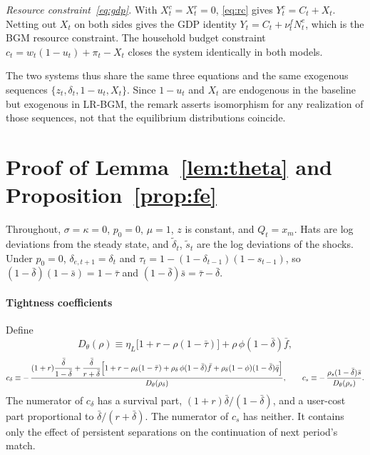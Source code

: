 \documentclass[authoryear, review, 12pt]{elsarticle}
\begin{document}
\emph{Resource constraint~\eqref{eq:gdp}.} With
$X_t^c=X_t^r=0$, \eqref{eq:rc} gives $Y_t^c = C_t + X_t$.
Netting out $X_t$ on both sides gives the GDP identity
$Y_t = C_t + \nu_t^f N_t^e$, which is the BGM resource constraint.
The household budget constraint
$c_t = w_t(1-u_t) + \pi_t - X_t$
closes the system identically in both models.

The two systems thus share the same three equations and
the same exogenous sequences $\{z_t,\delta_t,1-u_t,X_t\}$.
Since $1-u_t$ and $X_t$ are endogenous in the baseline but
exogenous in LR-BGM, the remark asserts isomorphism
for any realization of those sequences, not that the
equilibrium distributions coincide.

\section{Proof of Lemma~\ref{lem:theta} and Proposition~\ref{prop:fe}}
\label{app:proof_fe}

Throughout, $\sigma=\kappa=0$, $p_0=0$, $\mu=1$, $z$ is constant, and $Q_t=x_m$. Hats are log
deviations from the steady state, and $\tilde\delta_t$, $\tilde{s}_t$ are the log deviations
of the shocks. Under $p_0=0$, $\delta_{e,t+1}=\delta_t$ and
$\tau_t=1-(1-\delta_{t-1})(1-s_{t-1})$, so $(1-\bar\delta)(1-\bar{s})=1-\bar\tau$ and
$(1-\bar\delta)\bar{s}=\bar\tau-\bar\delta$.

\paragraph{Tightness coefficients}
Define
\[
	D_\theta(\rho)\equiv\eta_L\bigl[1+r-\rho(1-\bar\tau)\bigr]+\rho\,\phi(1-\bar\delta)\bar{f},
\]
\begin{equation}\label{eq:c_delta}
	c_\delta\equiv-\,\frac{(1+r)\dfrac{\bar\delta}{1-\bar\delta}
	+\dfrac{\bar\delta}{r+\bar\delta}\Bigl[1+r-\rho_\delta(1-\bar\tau)+\rho_\delta\,\phi(1-\bar\delta)\bar{f}
	+\rho_\delta(1-\phi)(1-\bar\delta)\bar{q}\Bigr]}{D_\theta(\rho_\delta)},
	\qquad
	c_s\equiv-\,\frac{\rho_s(1-\bar\delta)\bar{s}}{D_\theta(\rho_s)}.
\end{equation}
The numerator of $c_\delta$ has a survival part, $(1+r)\bar\delta/(1-\bar\delta)$, and a
user-cost part proportional to $\bar\delta/(r+\bar\delta)$. The numerator of $c_s$ has
neither. It contains only the effect of persistent separations on the continuation of
next period's match.
\end{document}
